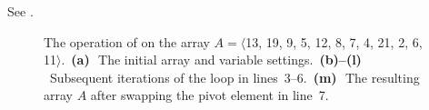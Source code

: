 See .
\begin{figure}[htb]
    \captionsetup[subfigure]{skip=-.8\cellsize, slc=off}
    \par\vspace{.5\cellsize}
    \par\vspace{.5\cellsize}
    \par\vspace{.5\cellsize}
    \par\vspace{.5\cellsize}
    \par\vspace{.5\cellsize}
    \par\vspace{.5\cellsize}
    \par\vspace{.5\cellsize}
    \par\vspace{.5\cellsize}
    \par\vspace{.5\cellsize}
    \par\vspace{.5\cellsize}
    \par\vspace{.5\cellsize}
    \par\vspace{.5\cellsize}
    \caption{The operation of  on the array $A=\langle$13, 19, 9, 5, 12, 8, 7, 4, 21, 2, 6, 11$\rangle$.\,
    \textbf{(a)}\,~The initial array and variable settings.\,
    \textbf{(b)--(l)}\,~Subsequent iterations of the  loop in lines~3--6.\,
    \textbf{(m)}\,~The resulting array $A$ after swapping the pivot element in line~7.} \label{fig:7.1-1}
\end{figure}

